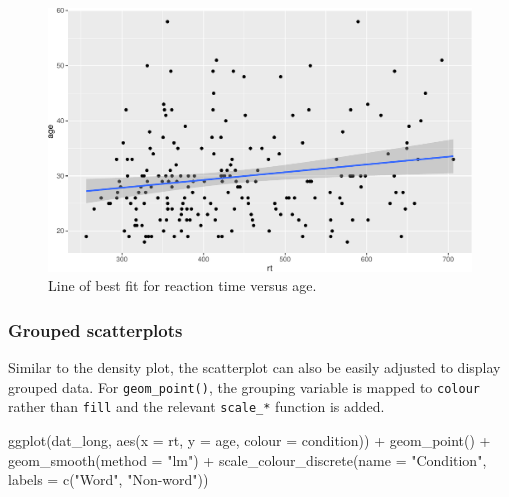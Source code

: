 \documentclass[
  english,
  doc,floatsintext]{apa6}
\newenvironment{Shaded}{\begin{snugshade}}{\end{snugshade}}
\newcommand{\AttributeTok}[1]{\textcolor[rgb]{0.77,0.63,0.00}{#1}}
\newcommand{\FunctionTok}[1]{\textcolor[rgb]{0.00,0.00,0.00}{#1}}
\newcommand{\NormalTok}[1]{#1}
\newcommand{\SpecialCharTok}[1]{\textcolor[rgb]{0.00,0.00,0.00}{#1}}
\newcommand{\StringTok}[1]{\textcolor[rgb]{0.31,0.60,0.02}{#1}}
\begin{document}
\begin{figure}

{\centering \includegraphics[width=1\linewidth]{images/smooth-plot-1} 

}

\caption{Line of best fit for reaction time versus age.}\label{fig:smooth-plot}
\end{figure}

\hypertarget{grouped-scatterplots}{%
\subsubsection{Grouped scatterplots}\label{grouped-scatterplots}}

Similar to the density plot, the scatterplot can also be easily adjusted to display grouped data. For \texttt{geom\_point()}, the grouping variable is mapped to \texttt{colour} rather than \texttt{fill} and the relevant \texttt{scale\_*} function is added.

\begin{Shaded}
\begin{Highlighting}[]
\FunctionTok{ggplot}\NormalTok{(dat\_long, }\FunctionTok{aes}\NormalTok{(}\AttributeTok{x =}\NormalTok{ rt, }\AttributeTok{y =}\NormalTok{ age, }\AttributeTok{colour =}\NormalTok{ condition)) }\SpecialCharTok{+}
  \FunctionTok{geom\_point}\NormalTok{() }\SpecialCharTok{+}
  \FunctionTok{geom\_smooth}\NormalTok{(}\AttributeTok{method =} \StringTok{"lm"}\NormalTok{) }\SpecialCharTok{+}
  \FunctionTok{scale\_colour\_discrete}\NormalTok{(}\AttributeTok{name =} \StringTok{"Condition"}\NormalTok{,}
                      \AttributeTok{labels =} \FunctionTok{c}\NormalTok{(}\StringTok{"Word"}\NormalTok{, }\StringTok{"Non{-}word"}\NormalTok{))}
\end{Highlighting}
\end{Shaded}
\end{document}

